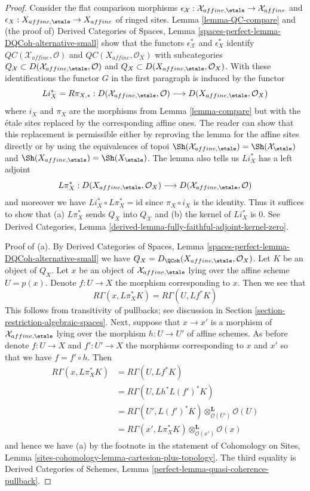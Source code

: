 \begin{proof}
\medskip\noindent
Consider the flat comparison morphisms
$\epsilon_\mathcal{X} : \mathcal{X}_{affine, \etale} \to \mathcal{X}_{affine}$
and $\epsilon_X : X_{affine, \etale} \to X_{affine}$
of ringed sites. Lemma \ref{lemma-QC-compare} and
(the proof of) Derived Categories of Spaces, Lemma
\ref{spaces-perfect-lemma-DQCoh-alternative-small}
show that the functors
$\epsilon_\mathcal{X}^*$ and $\epsilon_X^*$
identify $\mathit{QC}(\mathcal{X}_{affine}, \mathcal{O})$
and $\mathit{QC}(X_{affine}, \mathcal{O}_X)$
with subcategories
$Q_\mathcal{X} \subset D(\mathcal{X}_{affine, \etale}, \mathcal{O})$
and
$Q_X \subset D(X_{affine, \etale}, \mathcal{O}_X)$.
With these identifications
the functor $G$ in the first paragraph is induced by the functor
$$
Li_X^* = R\pi_{X, *}:
D(\mathcal{X}_{affine, \etale}, \mathcal{O})
\longrightarrow
D(X_{affine, \etale}, \mathcal{O}_X)
$$
where $i_X$ and $\pi_X$ are the morphisms from Lemma \ref{lemma-compare}
but with the \'etale sites replaced by the corresponding affine ones.
The reader can show that this replacement is permissible either
by reproving the lemma for the affine sites directly or
by using the equivalences of topoi
$\Sh(\mathcal{X}_{affine, \etale}) = \Sh(\mathcal{X}_\etale)$ and
$\Sh(X_{affine, \etale}) = \Sh(X_\etale)$.
The lemma also tells us $Li_X^*$ has a left adjoint
$$
L\pi_X^*:
D(X_{affine, \etale}, \mathcal{O}_X)
\longrightarrow
D(\mathcal{X}_{affine, \etale}, \mathcal{O})
$$
and moreover we have $Li_X^* \circ L\pi_X^* = \text{id}$
since $\pi_X \circ i_X$ is the identity. Thus it suffices
to show that (a) $L\pi_X^*$ sends $Q_X$ into $Q_\mathcal{X}$
and (b) the kernel of $Li_X^*$ is $0$.
See Derived Categories, Lemma
\ref{derived-lemma-fully-faithful-adjoint-kernel-zero}.

\medskip\noindent
Proof of (a). By Derived Categories of Spaces, Lemma
\ref{spaces-perfect-lemma-DQCoh-alternative-small}
we have $Q_X = D_\QCoh(X_{affine, \etale}, \mathcal{O}_X)$.
Let $K$ be an object of $Q_X$. Let $x$ be an object of
$\mathcal{X}_{affine, \etale}$ lying over the affine
scheme $U = p(x)$. Denote $f : U \to X$ the morphism corresponding
to $x$. Then we see that
$$
R\Gamma(x, L\pi_X^*K) = R\Gamma(U, Lf^*K)
$$
This follows from transitivity of pullbacks; see discussion in
Section \ref{section-restriction-algebraic-spaces}.
Next, suppose that $x \to x'$ is a morphism of $\mathcal{X}_{affine, \etale}$
lying over the morphism $h : U \to U'$ of affine schemes.
As before denote $f : U \to X$ and $f' : U' \to X$ the morphisms
corresponding to $x$ and $x'$ so that we have $f = f' \circ h$.
Then
\begin{align*}
R\Gamma(x, L\pi_X^*K)
& =
R\Gamma(U, Lf^*K) \\
& =
R\Gamma(U, Lh^*L(f')^*K) \\
& =
R\Gamma(U', L(f')^*K) \otimes_{\mathcal{O}(U')}^\mathbf{L} \mathcal{O}(U) \\
& =
R\Gamma(x', L\pi_X^*K) \otimes_{\mathcal{O}(x')}^\mathbf{L} \mathcal{O}(x)
\end{align*}
and hence we have (a) by the footnote in the statement of
Cohomology on Sites, Lemma
\ref{sites-cohomology-lemma-cartesion-plus-topology}. The third equality is
Derived Categories of Schemes, Lemma
\ref{perfect-lemma-quasi-coherence-pullback}.


\end{proof}
